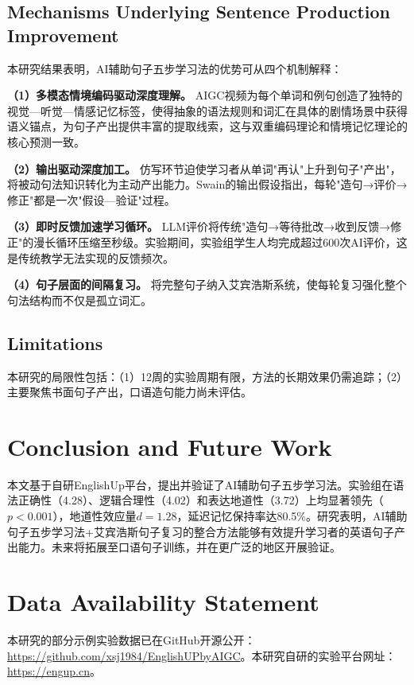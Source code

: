 \documentclass[Afour,sageapa,times]{sagej}
\begin{document}
\subsection{Mechanisms Underlying Sentence Production Improvement}
本研究结果表明，AI辅助句子五步学习法的优势可从四个机制解释：

\textbf{（1）多模态情境编码驱动深度理解。} AIGC视频为每个单词和例句创造了独特的视觉—听觉—情感记忆标签，使得抽象的语法规则和词汇在具体的剧情场景中获得语义锚点，为句子产出提供丰富的提取线索，这与双重编码理论\cite{paivio1991dual}和情境记忆理论\cite{tulving1983elements}的核心预测一致。

\textbf{（2）输出驱动深度加工。} 仿写环节迫使学习者从单词"再认"上升到句子"产出"，将被动句法知识转化为主动产出能力。Swain的输出假设指出，每轮"造句→评价→修正"都是一次"假设—验证"过程\cite{swain1995three}。

\textbf{（3）即时反馈加速学习循环。} LLM评价将传统"造句→等待批改→收到反馈→修正"的漫长循环压缩至秒级。实验期间，实验组学生人均完成超过600次AI评价，这是传统教学无法实现的反馈频次。

\textbf{（4）句子层面的间隔复习。} 将完整句子纳入艾宾浩斯系统，使每轮复习强化整个句法结构而不仅是孤立词汇。

\subsection{Limitations}
本研究的局限性包括：（1）12周的实验周期有限，方法的长期效果仍需追踪；（2）主要聚焦书面句子产出，口语造句能力尚未评估。


\section{Conclusion and Future Work}  %

本文基于自研EnglishUp平台，提出并验证了AI辅助句子五步学习法。实验组在语法正确性（4.28）、逻辑合理性（4.02）和表达地道性（3.72）上均显著领先（$p<0.001$），地道性效应量$d=1.28$，延迟记忆保持率达80.5\%。研究表明，AI辅助句子五步学习法+艾宾浩斯句子复习的整合方法能够有效提升学习者的英语句子产出能力。未来将拓展至口语句子训练，并在更广泛的地区开展验证。


\section*{Data Availability Statement}
本研究的部分示例实验数据已在GitHub开源公开：\url{https://github.com/xsj1984/EnglishUPbyAIGC}。本研究自研的实验平台网址：\url{https://engup.cn}。
\end{document}
